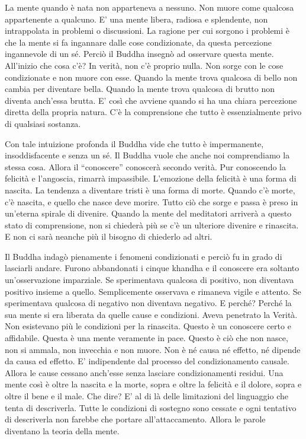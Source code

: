 La mente quando è nata non apparteneva a nessuno. Non muore come
qualcosa appartenente a qualcuno. E' una mente libera, radiosa e
splendente, non intrappolata in problemi o discussioni. La ragione per
cui sorgono i problemi è che la mente si fa ingannare dalle cose
condizionate, da questa percezione ingannevole di un sé. Perciò il
Buddha insegnò ad osservare questa mente. All'inizio che cosa c'è? In
verità, non c'è proprio nulla. Non sorge con le cose condizionate e non
muore con esse. Quando la mente trova qualcosa di bello non cambia per
diventare bella. Quando la mente trova qualcosa di brutto non diventa
anch'essa brutta. E' così che avviene quando si ha una chiara percezione
diretta della propria natura. C'è la comprensione che tutto è
essenzialmente privo di qualsiasi sostanza.

Con tale intuizione profonda il Buddha vide che tutto è impermanente,
insoddisfacente e senza un sé. Il Buddha vuole che anche noi
comprendiamo la stessa cosa. Allora il ``conoscere'' conoscerà secondo
verità. Pur conoscendo la felicità e l'angoscia, rimarrà impassibile.
L'emozione della felicità è una forma di nascita. La tendenza a
diventare tristi è una forma di morte. Quando c'è morte, c'è nascita, e
quello che nasce deve morire. Tutto ciò che sorge e passa è preso in
un'eterna spirale di divenire. Quando la mente del meditatori arriverà a
questo stato di comprensione, non si chiederà più se c'è un ulteriore
divenire e rinascita. E non ci sarà neanche più il bisogno di chiederlo
ad altri.

Il Buddha indagò pienamente i fenomeni condizionati e perciò fu in grado
di lasciarli andare. Furono abbandonati i cinque khandha e il conoscere
era soltanto un'osservazione imparziale. Se sperimentava qualcosa di
positivo, non diventava positivo insieme a quello. Semplicemente
osservava e rimaneva vigile e attento. Se sperimentava qualcosa di
negativo non diventava negativo. E perché? Perché la sua mente si era
liberata da quelle cause e condizioni. Aveva penetrato la Verità. Non
esistevano più le condizioni per la rinascita. Questo è un conoscere
certo e affidabile. Questa è una mente veramente in pace. Questo è ciò
che non nasce, non si ammala, non invecchia e non muore. Non è né causa
né effetto, né dipende da causa ed effetto. E' indipendente dal processo
del condizionamento causale. Allora le cause cessano anch'esse senza
lasciare condizionamenti residui. Una mente così è oltre la nascita e la
morte, sopra e oltre la felicità e il dolore, sopra e oltre il bene e il
male. Che dire? E' al di là delle limitazioni del linguaggio che tenta
di descriverla. Tutte le condizioni di sostegno sono cessate e ogni
tentativo di descriverla non farebbe che portare all'attaccamento.
Allora le parole diventano la teoria della mente.

